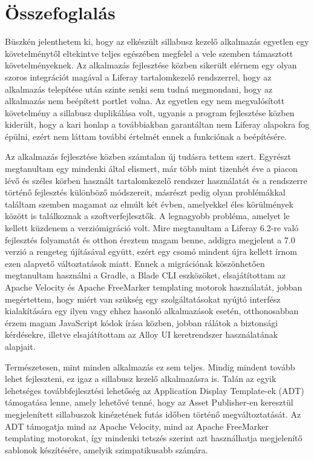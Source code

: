 \documentclass[hidelinks, 12pt, a4paper]{report}
\begin{document}
\chapter{Összefoglalás}

Büszkén jelenthetem ki, hogy az elkészült sillabusz kezelő alkalmazás egyetlen egy követelménytől eltekintve teljes egészében megfelel a vele szemben támasztott követelményeknek. Az alkalmazás fejlesztése közben sikerült elérnem egy olyan szoros integrációt magával a Liferay tartalomkezelő rendszerrel, hogy az alkalmazás telepítése után szinte senki sem tudná megmondani, hogy az alkalmazás nem beépített portlet volna. Az egyetlen egy nem megvalósított követelmény a sillabusz duplikálása volt, ugyanis a program fejlesztése közben kiderült, hogy a kari honlap a továbbiakban garantáltan nem Liferay alapokra fog épülni, ezért nem láttam további értelmét ennek a funkciónak a beépítésére.

Az alkalmazás fejlesztése közben számtalan új tudásra tettem szert. Egyrészt megtanultam egy mindenki által elismert, már több mint tizenhét éve a piacon lévő és széles körben használt tartalomkezelő rendszer használatát és a rendszerre történő fejlesztés különböző módszereit, másrészt pedig olyan problémákkal találtam szemben magamat az elmúlt két évben, amelyekkel éles körülmények között is találkoznak a szoftverfejlesztők. A legnagyobb probléma, amelyet le kellett küzdenem a verziómigráció volt. Mire megtanultam a Liferay 6.2-re való fejlesztés folyamatát és otthon éreztem magam benne, addigra megjelent a 7.0 verzió a rengeteg újításával együtt, ezért egy csomó mindent újra kellett írnom ezen alapvető változtatások miatt. Ennek a migrációnak köszönhetően megtanultam használni a Gradle, a Blade CLI eszközöket, elsajátítottam az Apache Velocity és Apache FreeMarker templating motorok \cite{apache-velocity} használatát, jobban megértettem, hogy miért van szükség egy szolgáltatásokat nyújtó interfész kialakítására egy ilyen vagy ehhez hasonló alkalmazások esetén, otthonosabban érzem magam JavaScript kódok írása közben, jobban rálátok a biztonsági kérdésekre, illetve elsajátítottam az Alloy UI keretrendszer \cite{alloyui} használatának alapjait.

Természetesen, mint minden alkalmazás ez sem teljes. Mindig mindent tovább lehet fejleszteni, ez igaz a sillabusz kezelő alkalmazásra is. Talán az egyik lehetséges továbbfejlesztési lehetőség az Application Display Template-ek (ADT) támogatása lenne, amely lehetővé tenné, hogy az Asset Publisher-en keresztül megjelenített sillabuszok kinézetének futás időben történő megváltoztatását. Az ADT támogatja mind az Apache Velocity, mind az Apache FreeMarker templating \cite{apache-velocity, apache-freemarker} motorokat, így mindenki tetszés szerint azt használhatja megjelenítő sablonok készítésére, amelyik szimpatikusabb számára.
\end{document}
